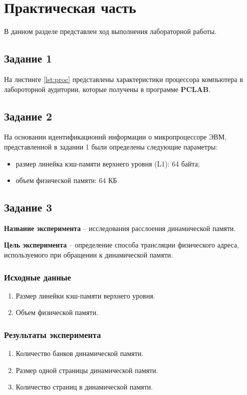\chapter{Практическая часть}

В данном разделе представлен ход выполнения лабораторной работы.

\section{Задание 1}

На листинге \ref{lst:proc} представлены характеристики процессора компьютера
в лабороторной аудитории, которые получены в программе \textbf{PCLAB}.


\section{Задание 2}

На основании идентификационнй информации о микропроцессоре ЭВМ, представленной
в задании 1 были определены следующие параметры:
\begin{itemize}
    \item размер линейка кэш-памяти верхнего уровня (L1): 64 байта;
    \item объем физической памяти: 64 КБ
\end{itemize}

\section{Задание 3}

\textbf{Название эксперимента} -- исследования расслоения динамической памяти.

\textbf{Цель эксперимента} -- определение способа трансляции физического
адреса, используемого при обращении к динамической памяти.

\subsection{Исходные данные}
\begin{enumerate}
	\item Размер линейки кэш-памяти верхнего уровня.
	\item Объем физической памяти.
\end{enumerate}

\subsection{Результаты эксперимента}
\begin{enumerate}
	\item Количество банков динамической памяти.
	\item Размер одной страницы динамической памяти.
	\item Количество страниц в динамической памяти.
\end{enumerate}

